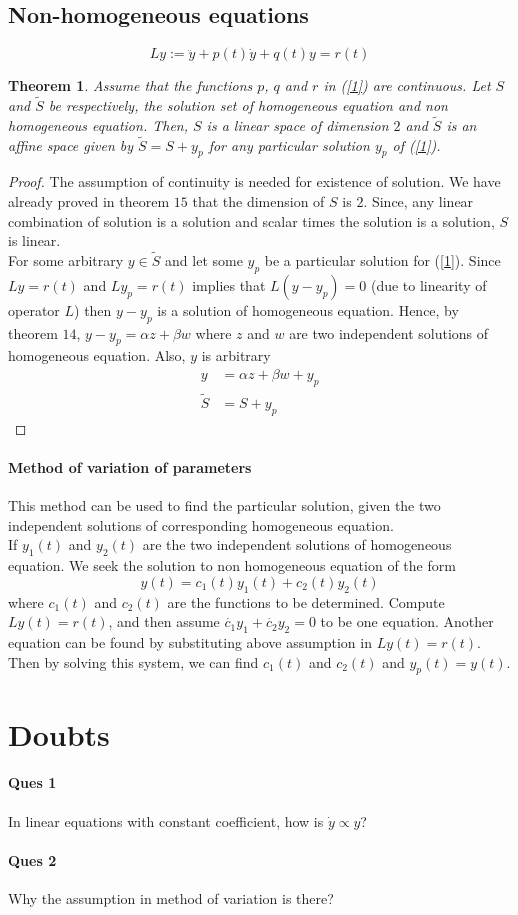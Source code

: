 \documentclass[12pt,reqno]{amsart}
\theoremstyle{plain}
\newtheorem{thm}{Theorem}
\theoremstyle{definition}
\begin{document}
\subsection{Non-homogeneous equations}
\begin{equation}\label{1}
    Ly := \ddot{y} + p(t)\dot{y} + q(t)y = r(t)
\end{equation}
\begin{thm}
    Assume that the functions $p$, $q$ and $r$ in (\ref{1}) are continuous. Let $S$ and $\tilde{S}$ be respectively, the solution set of homogeneous equation and non homogeneous equation. Then, $S$ is a linear space of dimension $2$ and $\tilde{S}$ is an affine space given by $\tilde{S} = S + y_p$ for any particular solution $y_p$ of (\ref{1}).
\end{thm}
\begin{proof}
    The assumption of continuity is needed for existence of solution. We have already proved in theorem $15$ that the dimension of $S$ is $2$. Since, any linear combination of solution is a solution and scalar times the solution is a solution, $S$ is linear.\\
    For some arbitrary $y \in \tilde{S}$ and let some $y_p$ be a particular solution for (\ref{1}). Since $Ly = r(t)$ and $Ly_p = r(t)$ implies that $L(y-y_p) = 0$ (due to linearity of operator $L$) then $y - y_p$ is a solution of homogeneous equation. Hence, by theorem $14$, $y - y_p = \alpha z + \beta w$ where $z$ and $w$ are two independent solutions of homogeneous equation. Also, $y$ is arbitrary
    \begin{align*}
        y &= \alpha z + \beta w + y_p\\
        \tilde{S} &= S + y_p        
    \end{align*}
\end{proof}
\paragraph{\bf Method of variation of parameters} This method can be used to find the particular solution, given the two independent solutions of corresponding homogeneous equation.\\
If $y_1(t)$ and $y_2(t)$ are the two independent solutions of homogeneous equation. We seek the solution to non homogeneous equation of the form 
$$ y(t) = c_1(t)y_1(t) + c_2(t)y_2(t) $$
where $c_1(t)$ and $c_2(t)$ are the functions to be determined. Compute $Ly(t) = r(t)$, and then assume $\dot{c_1}y_1 + \dot{c_2}y_2 = 0$ to be one equation. Another equation can be found by substituting above assumption in $Ly(t) = r(t)$. Then by solving this system, we can find $c_1(t)$ and $c_2(t)$ and $y_p(t) = y(t)$.




\section{Doubts}
\paragraph{\bf Ques 1} In linear equations with constant coefficient, how is $\dot{y} \propto y$?
\paragraph{\bf Ques 2} Why the assumption in method of variation is there?
\end{document}
